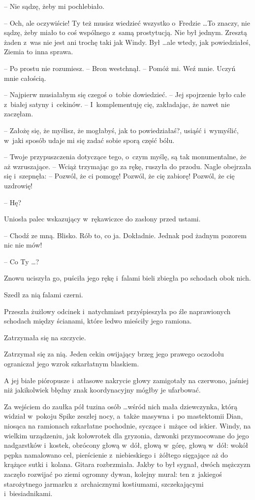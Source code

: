 \documentclass[oneside,polish,11pt,rmheadings]{mwbk}
\begin{document}
-- Nie sądzę, żeby mi pochlebiało. 

-- Och, ale oczywiście! Ty też musisz wiedzieć wszystko o~Fredzie \ldots  To znaczy, nie sądzę, żeby miało to coś wspólnego z~samą prostytucją. Nie był jednym. Zresztą żaden z~was nie jest ani trochę taki jak Windy. Był \ldots  ale wtedy, jak powiedziałeś, Ziemia to inna sprawa. 

-- Po prostu nie rozumiesz. -- Bron westchnął. -- Pomóż mi. Weź mnie. Uczyń mnie całością. 

-- Najpierw musiałabym się czegoś o~tobie dowiedzieć. -- Jej spojrzenie było całe z~białej satyny i~cekinów. -- I~komplementuję cię, zakładając, że nawet nie zaczęłam. 

-- Założę się, że myślisz, że mogłabyś, jak to powiedziałaś?, usiąść i~wymyślić, w~jaki sposób udaje mi się zadać sobie sporą część bólu. 

-- Twoje przypuszczenia dotyczące tego, o~czym myślę, są tak monumentalne, że aż wzruszające. -- Wciąż trzymając go za rękę, ruszyła do przodu. Nagle obejrzała się i~szepnęła: -- Pozwól, że ci pomogę! Pozwól, że cię zabiorę! Pozwól, że cię uzdrowię! 

-- Hę? 

Uniosła palec wskazujący w~rękawiczce do zasłony przed ustami. 

-- Chodź ze mną. Blisko. Rób to, co ja. Dokładnie. Jednak pod żadnym pozorem nic nie mów! 

-- Co Ty  \ldots  ? 

Znowu uciszyła go, puściła jego rękę i~falami bieli zbiegła po schodach obok nich. 

Szedł za nią falami czerni. 

Przeszła żużlowy odcinek i~natychmiast przyśpieszyła po źle naprawionych schodach między ścianami, które ledwo mieściły jego ramiona. 

Zatrzymała się na szczycie. 

Zatrzymał się za nią. Jeden cekin owijający brzeg jego prawego oczodołu ograniczał jego wzrok szkarłatnym blaskiem. 

A jej białe pióropusze i~atłasowe nakrycie głowy zamigotały na czerwono, jaśniej niż jakikolwiek błędny znak koordynacyjny mógłby je ufarbować. 

Za wejściem do zaułka pół tuzina osób \ldots   wśród nich mała dziewczynka, którą widział w~pokoju Spike zeszłej nocy, a~także masywna i~po mastektomii Dian, niosąca na ramionach szkarłatne pochodnie, syczące i~mżące od iskier. Windy, na wielkim urządzeniu, jak kołowrotek dla gryzonia, dzwonki przymocowane do jego nadgarstków i~kostek, obrócony głową w~dół, głową w~górę, głową w~dół: wokół pępka namalowano cel, pierścienie z~niebieskiego i~żółtego sięgające aż do krążące sutki i~kolana. Gitara rozbrzmiała. Jakby to był sygnał, dwóch mężczyzn zaczęło rozwijać po ziemi ogromny dywan, kolejny mural: ten z~jakiegoś starożytnego jarmarku z~archaicznymi kostiumami, szczekającymi i~biesiadnikami. 
\end{document}
